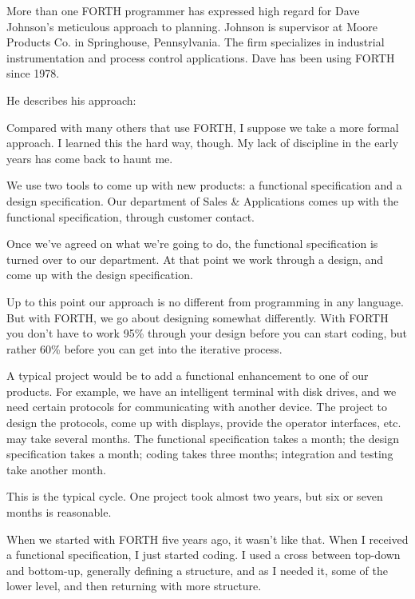 \begin{interview} %
\noindent More than one FORTH programmer has expressed high regard for Dave
Johnson's meticulous approach to planning. Johnson is supervisor at
Moore Products Co. in Springhouse, Pennsylvania. The firm specializes
in industrial instrumentation and process control applications. Dave has
been using FORTH since 1978.

He describes his approach:
\begin{tfquot}
Compared with many others that use FORTH, I suppose we take a more
formal approach. I learned this the hard way, though. My lack of discipline
in the early years has come back to haunt me.

We use two tools to come up with new products: a functional specification
and a design specification. Our department of Sales \& Applications comes
up with the functional specification, through customer contact.

Once we've agreed on what we're going to do, the functional specification is
turned over to our department. At that point we work through a design,
and come up with the design specification.

Up to this point our approach is no different from programming in any
language. But with FORTH, we go about designing somewhat differently.
With FORTH you don't have to work 95\% through your design before you
can start coding, but rather 60\% before you can get into the iterative
process.


A typical project would be to add a functional enhancement to one of
our products. For example, we have an intelligent terminal with disk
drives, and we need certain protocols for communicating with another
device. The project to design the protocols, come up with displays,
provide the operator interfaces, etc. may take several months. The
functional specification takes a month; the design specification takes
a month; coding takes three months; integration and testing take
another month.

This is the typical cycle. One project took almost two years, but six
or seven months is reasonable.

When we started with FORTH five years ago, it wasn't like that. When I
received a functional specification, I just started coding. I used a
cross between top-down and bottom-up, generally defining a structure,
and as I needed it, some of the lower level, and then returning with
more structure.


\end{tfquot}
\end{interview}
